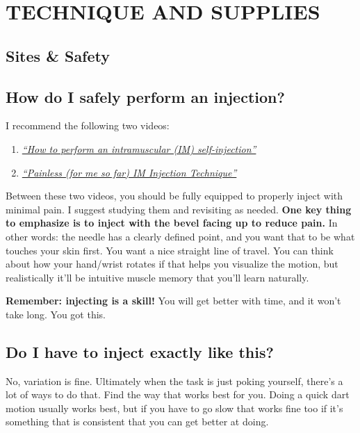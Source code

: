 \documentclass{article}
\begin{document}
{{ 

\section{TECHNIQUE AND SUPPLIES} \label{ts}

\subsection*{Sites \& Safety}

\subsection{How do I safely perform an injection?}

I recommend the following two videos:

\begin{enumerate}
  \item \href{https://www.youtube.com/watch?v=cBabaGC2Dok}{\textit{“How to perform an intramuscular (IM) self-injection”}}
  \item \href{https://www.youtube.com/watch?v=YfNlAZLxLyw}{\textit{“Painless (for me so far) IM Injection Technique”}}
\end{enumerate}

Between these two videos, you should be fully equipped to properly inject with minimal pain. I suggest studying them and revisiting as needed. \textbf{One key thing to emphasize is to inject with the bevel facing up to reduce pain.} In other words: the needle has a clearly defined point, and you want that to be what touches your skin first. You want a nice straight line of travel. You can think about how your hand/wrist rotates if that helps you visualize the motion, but realistically it'll be intuitive muscle memory that you'll learn naturally.

\textbf{Remember: injecting is a skill!} You will get better with time, and it won’t take long. You got this.

\subsection{Do I have to inject exactly like this?}

No, variation is fine. Ultimately when the task is just poking yourself, there’s a lot of ways to do that. Find the way that works best for you. Doing a quick dart motion usually works best, but if you have to go slow that works fine too if it’s something that is consistent that you can get better at doing.

}}
\end{document}
